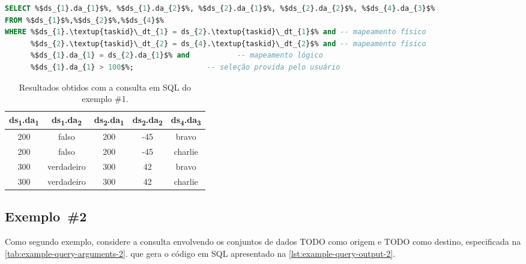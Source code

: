 \begin{minipage}[c]{0.95\textwidth}
\begin{lstlisting}[language=sql,label={lst:example-query-output-1},caption={[Código SQ gerado no exemplo~\#1]Código SQL gerado pela função \texttt{generateSqlQuery} no exemplo~\#1.}]
SELECT %$ds_{1}.da_{1}$%, %$ds_{1}.da_{2}$%, %$ds_{2}.da_{1}$%, %$ds_{2}.da_{2}$%, %$ds_{4}.da_{3}$%
FROM %$ds_{1}$%,%$ds_{2}$%,%$ds_{4}$%
WHERE %$ds_{1}.\textup{taskid}\_dt_{1} = ds_{2}.\textup{taskid}\_dt_{1}$% and -- mapeamento físico
      %$ds_{2}.\textup{taskid}\_dt_{2} = ds_{4}.\textup{taskid}\_dt_{2}$% and -- mapeamento físico
      %$ds_{1}.da_{1} = ds_{2}.da_{1}$% and           -- mapeamento lógico
      %$ds_{1}.da_{1} > 100$%;                 -- seleção provida pelo usuário
\end{lstlisting}
\end{minipage}

\begin{table}[htb]
    \centering
    \begin{tabular}{c|c|c|c|c}
\textbf{ds\textsubscript{1}.da\textsubscript{1}} & \textbf{ds\textsubscript{1}.da\textsubscript{2}} & \textbf{ds\textsubscript{2}.da\textsubscript{1}} & \textbf{ds\textsubscript{2}.da\textsubscript{2}} & \textbf{ds\textsubscript{4}.da\textsubscript{3}} \\ \hline
200              & falso            & 200              & -45              & bravo            \\
200              & falso            & 200              & -45              & charlie          \\
300              & verdadeiro       & 300              & 42               & bravo            \\
300              & verdadeiro       & 300              & 42               & charlie         
    \end{tabular}
    \caption[Resultados obtidos com a consulta em SQL do exemplo \#1]{Resultados obtidos com a consulta em SQL do exemplo \#1.}
    \label{tab:example-query-results-1}
\end{table}

\subsection*{Exemplo~\#2}


Como segundo exemplo, considere a consulta envolvendo os conjuntos de dados TODO como origem e TODO como destino, especificada na \autoref{tab:example-query-arguments-2}. que gera o código em SQL apresentado na \autoref{lst:example-query-output-2}.

